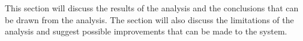 \documentclass[]{VUMIFTemplateClass}
\begin{document}

This section will discuss the results of the analysis and the conclusions that can be drawn from the analysis. The section will also discuss the limitations of the analysis and suggest possible improvements that can be made to the system.

\printbibliography[title = {References and sources}]






\end{document}
